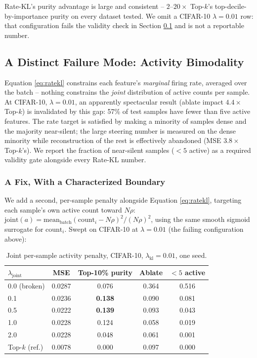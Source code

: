 \documentclass[11pt,twocolumn]{article}
\begin{document}
Rate-KL's purity advantage is large and consistent -- $2$--$20\times$ Top-$k$'s top-decile-by-importance purity on every dataset tested. We omit a CIFAR-10 $\lambda{=}0.01$ row: that configuration fails the validity check in Section \ref{sec:bimodality} and is not a reportable number.

\subsection{A Distinct Failure Mode: Activity Bimodality}
\label{sec:bimodality}
Equation \ref{eq:ratekl} constrains each feature's \emph{marginal} firing rate, averaged over the batch -- nothing constrains the \emph{joint} distribution of active counts per sample. At CIFAR-10, $\lambda{=}0.01$, an apparently spectacular result (ablate impact $4.4\times$ Top-$k$) is invalidated by this gap: 57\% of test samples have fewer than five active features. The rate target is satisfied by making a minority of samples dense and the majority near-silent; the large steering number is measured on the dense minority while reconstruction of the rest is effectively abandoned (MSE $3.8\times$ Top-$k$'s). We report the fraction of near-silent samples ($<5$ active) as a required validity gate alongside every Rate-KL number.

\subsubsection{A Fix, With a Characterized Boundary}
We add a second, per-sample penalty alongside Equation \ref{eq:ratekl}, targeting each sample's own active count toward $N\rho$: $\mathrm{joint}(a) = \mathrm{mean}_{\mathrm{batch}}(\mathrm{count}_i - N\rho)^2/(N\rho)^2$, using the same smooth sigmoid surrogate for $\mathrm{count}_i$. Swept on CIFAR-10 at $\lambda{=}0.01$ (the failing configuration above):

\begin{table}[h]
\centering
\caption{Joint per-sample activity penalty, CIFAR-10, $\lambda_{\mathrm{kl}}{=}0.01$, one seed.}
\label{tab:jointfix}
\begin{tabular}{@{}lcccc@{}}
\toprule
$\lambda_{\mathrm{joint}}$ & MSE & Top-10\% purity & Ablate & $<5$ active \\ \midrule
0.0 (broken) & 0.0287 & 0.076 & 0.364 & 0.516 \\
0.1 & 0.0236 & \textbf{0.138} & 0.090 & 0.081 \\
0.5 & 0.0222 & \textbf{0.139} & 0.093 & 0.043 \\
1.0 & 0.0228 & 0.124 & 0.058 & 0.019 \\
2.0 & 0.0228 & 0.048 & 0.061 & 0.001 \\
Top-$k$ (ref.) & 0.0078 & 0.000 & 0.097 & 0.000 \\ \bottomrule
\end{tabular}
\end{table}
\end{document}
